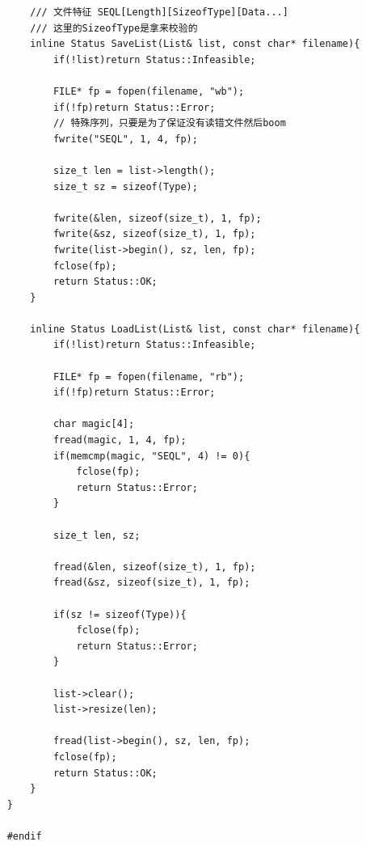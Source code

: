 \documentclass[supercite]{Experimental_Report}
\theoremstyle{definition}
\begin{document}
\begin{lstlisting}
		/// 文件特征 SEQL[Length][SizeofType][Data...]
		/// 这里的SizeofType是拿来校验的
		inline Status SaveList(List& list, const char* filename){
			if(!list)return Status::Infeasible;
			
			FILE* fp = fopen(filename, "wb");
			if(!fp)return Status::Error;
			// 特殊序列，只要是为了保证没有读错文件然后boom
			fwrite("SEQL", 1, 4, fp);
			
			size_t len = list->length();
			size_t sz = sizeof(Type);
			
			fwrite(&len, sizeof(size_t), 1, fp);
			fwrite(&sz, sizeof(size_t), 1, fp);
			fwrite(list->begin(), sz, len, fp);
			fclose(fp);
			return Status::OK;
		}
		
		inline Status LoadList(List& list, const char* filename){
			if(!list)return Status::Infeasible;
			
			FILE* fp = fopen(filename, "rb");
			if(!fp)return Status::Error;
			
			char magic[4]; 
			fread(magic, 1, 4, fp);
			if(memcmp(magic, "SEQL", 4) != 0){ 
				fclose(fp); 
				return Status::Error; 
			}
			
			size_t len, sz;
			
			fread(&len, sizeof(size_t), 1, fp);
			fread(&sz, sizeof(size_t), 1, fp);
			
			if(sz != sizeof(Type)){
				fclose(fp); 
				return Status::Error; 
			}
			
			list->clear(); 
			list->resize(len);
			
			fread(list->begin(), sz, len, fp);
			fclose(fp);
			return Status::OK;
		}
	}
	
	#endif
\end{lstlisting}
\end{document}
